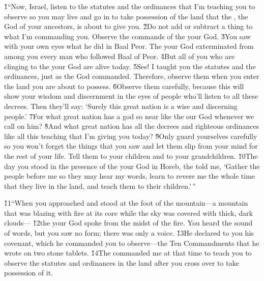 \v{1}``Now, Israel, listen to the statutes and the ordinances that I'm teaching you to observe so you may live and go in to take possession of the land that the , the God of your ancestors, is about to give you. \v{2}Do not add or subtract a thing to what I'm commanding you. Observe the commands of the  your God. \v{3}You saw with your own eyes what he did in Baal Peor. The  your God exterminated from among you every man who followed Baal of Peor. \v{4}But all of you who are clinging to the  your God are alive today. \v{5}See! I taught you the statutes and the ordinances, just as the  God commanded. Therefore, observe them when you enter the land you are about to possess. \v{6}Observe them carefully, because this will show your wisdom and discernment in the eyes of people who'll listen to all these decrees. Then they'll say: `Surely this great nation is a wise and discerning people.' \v{7}For what great nation has a god so near like the  our God whenever we call on him? \v{8}And what great nation has all the decrees and righteous ordinances like all this teaching that I'm giving you today? \v{9}Only guard yourselves carefully so you won't forget the things that you saw and let them slip from your mind for the rest of your life. Tell them to your children and to your grandchildren. \v{10}The day you stood in the presence of the  your God in Horeb, the  told me, `Gather the people before me so they may hear my words, learn to revere me the whole time that they live in the land, and teach them to their children.'\,''

\v{11}``When you approached and stood at the foot of the mountain---a mountain that was blazing with fire at its core while the sky was covered with thick, dark clouds--- \v{12}the  your God spoke from the midst of the fire. You heard the sound of words, but you saw no form; there was only a voice. \v{13}He declared to you his covenant, which he commanded you to observe---the Ten Commandments that he wrote on two stone tablets. \v{14}The  commanded me at that time to teach you to observe the statutes and ordinances in the land after you cross over to take possession of it.

